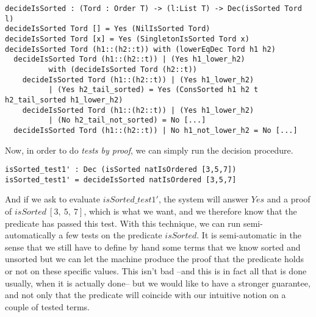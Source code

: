 \begin{lstlisting}
decideIsSorted : (Tord : Order T) -> (l:List T) -> Dec(isSorted Tord l)
decideIsSorted Tord [] = Yes (NilIsSorted Tord)
decideIsSorted Tord [x] = Yes (SingletonIsSorted Tord x)
decideIsSorted Tord (h1::(h2::t)) with (lowerEqDec Tord h1 h2)
  decideIsSorted Tord (h1::(h2::t)) | (Yes h1_lower_h2) 
          with (decideIsSorted Tord (h2::t))
    decideIsSorted Tord (h1::(h2::t)) | (Yes h1_lower_h2) 
          | (Yes h2_tail_sorted) = Yes (ConsSorted h1 h2 t h2_tail_sorted h1_lower_h2)
    decideIsSorted Tord (h1::(h2::t)) | (Yes h1_lower_h2) 
          | (No h2_tail_not_sorted) = No [...]
  decideIsSorted Tord (h1::(h2::t)) | No h1_not_lower_h2 = No [...]
\end{lstlisting}
Now, in order to do \emph{tests by proof}, we can simply run the decision procedure.

\begin{lstlisting}
isSorted_test1' : Dec (isSorted natIsOrdered [3,5,7])
isSorted_test1' = decideIsSorted natIsOrdered [3,5,7] 
\end{lstlisting}
And if we ask to evaluate $isSorted\_test1'$, the system will answer $Yes$ and a proof of $isSorted\ [3,\ 5,\ 7]$, which is what we want, and we therefore know that the predicate has passed this test. With this technique, we can run semi-automatically a few tests on the predicate $isSorted$. It is semi-automatic in the sense that we still have to define by hand some terms that we know sorted and unsorted but we can let the machine produce the proof that the predicate holds or not on these specific values. This isn't bad --and this is in fact all that is done usually, when it is actually done-- but we would like to have a stronger guarantee, and not only that the predicate will coincide with our intuitive notion on a couple of tested terms.





